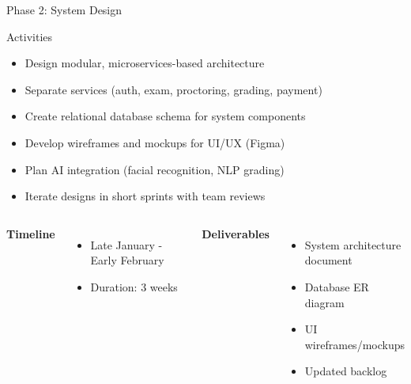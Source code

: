 \begin{frame}{Phase 2: System Design}
    \begin{block}{Activities}
        \begin{itemize}
            \item Design modular, microservices-based architecture
            \item Separate services (auth, exam, proctoring, grading, payment)
            \item Create relational database schema for system components
            \item Develop wireframes and mockups for UI/UX (Figma)
            \item Plan AI integration (facial recognition, NLP grading)
            \item Iterate designs in short sprints with team reviews
        \end{itemize}
    \end{block}
    
    \begin{columns}
        \textbf{Timeline}
        \begin{itemize}
            \item Late January - Early February
            \item Duration: 3 weeks
        \end{itemize}
        
        \textbf{Deliverables}
        \begin{itemize}
            \item System architecture document
            \item Database ER diagram
            \item UI wireframes/mockups
            \item Updated backlog
        \end{itemize}
    \end{columns}
\end{frame}

